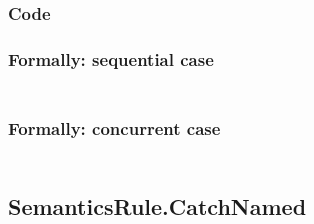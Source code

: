 \documentclass{book}
\begin{document}
  \subsubsection{Code}

  \subsubsection{Formally: sequential case}
  \begin{align}
  \end{align} 

  \subsubsection{Formally: concurrent case}
  \begin{align}
  \end{align} 

\subsection{SemanticsRule.CatchNamed \label{sec:SemanticsRule.CatchNamed}}
\end{document}
